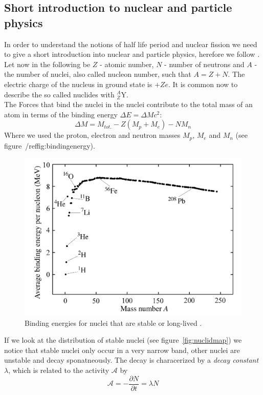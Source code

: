 \subsection{Short introduction to nuclear and particle physics}
In order to understand the notions of half life period and nuclear fission we need to
give a short introduction into nuclear and particle physics, herefore we follow \cite{Hooshyar}.
Let now in the following be $Z$ - atomic number,  $N$ - number of neutrons and  $A$ - the number of nuclei, also
called nucleon number, such that $A = Z + N$. The electric charge of the nucleus in ground state is $+Z e$.
It is common now to describe the so called nuclides with $_{Z}^{A}\textrm{Y}$.\\
The Forces that bind the nuclei in the nuclei contribute to the total mass of an atom in terms of the 
binding energy $\Delta E = \Delta M c^2$:
\begin{equation}
\Delta M = M_{tot.} - Z(M_p + M_e) - N M_n
\end{equation}
Where we used the proton, electron and neutron masses $M_p$, $M_e$ and $M_n$ 
(see figure~/ref{fig:bindingenergy}).
\begin{figure}[htpb]
    \centering
    \includegraphics[width=0.8\linewidth]{figures/bindingenergy}
    \caption{Binding energies for nuclei that are stable or long-lived \cite{Hooshyar}.}
    \label{fig:bindingenergy}
\end{figure}
If we look at the distribution of stable nuclei (see figure~\ref{fig:nuclidmap}) we notice
that stable nuclei only occur in a very narrow band, other nuclei are unstable and decay sponatneously.
The decay is characerized by a \textit{decay constant} $\lambda$, which is related to the activity $\mathcal{A}$
by 
\begin{equation}\label{eq:decay}
    \mathcal{A} = -\frac{\partial N}{\partial t} = \lambda N 
\end{equation}
